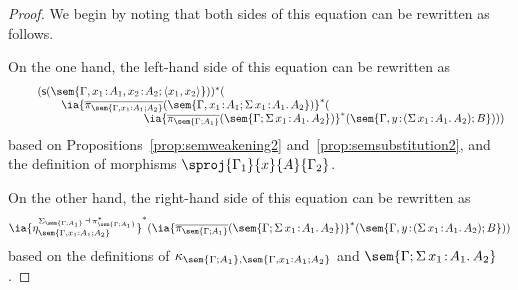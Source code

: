 \begin{proof}
We begin by noting that both sides of this equation can be rewritten as follows.

On the one hand, the left-hand side of this equation can be rewritten as
\[
\begin{array}{c}
\hspace{-8cm}
(\mathsf{s}(\sem{\Gamma, x_1 \!:\! A_1, x_2 \!:\! A_2; \langle x_1 , x_2 \rangle}))^*(
\\
\hspace{-4cm}
\ia{\overline{\pi_{\sem{\Gamma, x_1 : A_1 ; A_2}}}(\sem{\Gamma, x_1 \!:\! A_1; \Sigma\, x_1 \!:\! A_1 .\, A_2})}^*(
\\
\hspace{4cm}
\ia{\overline{\pi_{\sem{\Gamma;A_1}}}(\sem{\Gamma; \Sigma\, x_1 \!:\! A_1 .\, A_2})}^*(\sem{\Gamma, y \!:\! (\Sigma\, x_1 \!:\! A_1 .\, A_2); B})))
\end{array}
\]
based on Propositions~\ref{prop:semweakening2} and~\ref{prop:semsubstitution2}, and the definition of morphisms $\sproj {\Gamma_1} {x} {A} {\Gamma_2}$.

On the other hand, the right-hand side of this equation can be rewritten as
\[
\ia {\eta^{\Sigma_{\sem{\Gamma; A_1}} \,\dashv\, \pi^*_{\sem{\Gamma; A_1}}}_{\sem{\Gamma, x_1 : A_1; A_2}}}^*(\ia {\overline{\pi_{\sem{\Gamma;A_1}}}(\sem{\Gamma; \Sigma\, x_1 \!:\! A_1 .\, A_2})}^*(\sem{\Gamma, y \!:\! (\Sigma\, x_1 \!:\! A_1 .\, A_2); B}))
\]
based on the definitions of $\kappa_{\sem{\Gamma; A_1},\sem{\Gamma, x_1 : A_1; A_2}}$ and $\sem{\Gamma;\Sigma\, x_1 \!:\! A_1 .\, A_2}$.


\end{proof}
